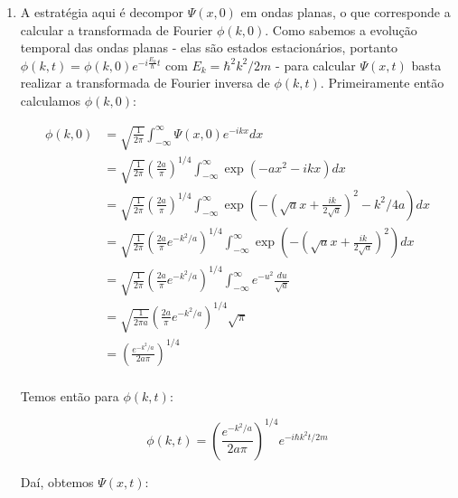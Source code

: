 \documentclass[a4paper, 12pt, notitlepage]{article}
\begin{document}
\begin{enumerate}
\begin{enumerate}
  \item A estratégia aqui é decompor $\Psi(x,0)$ em ondas planas, o que corresponde a calcular a transformada de Fourier $\phi(k, 0)$. Como sabemos a evolução temporal das ondas planas - elas são estados estacionários, portanto $\phi(k, t) = \phi(k, 0) e^{-i\frac{E_k}{\hbar} t}$ com $E_k = \hbar^2 k^2/2m$ - para calcular $\Psi(x, t)$ basta realizar a transformada de Fourier inversa de $\phi(k, t)$.
  Primeiramente então calculamos $\phi(k, 0)$:

  \begin{align*}
  \phi(k, 0) &= \sqrt{\frac{1}{2\pi}} \int_{-\infty}^{\infty} \Psi(x, 0) e^{-ikx} dx \\
  &= \sqrt{\frac{1}{2\pi}} \left(\frac{2a}{\pi}\right)^{1/4} \int_{-\infty}^{\infty} \exp\left(-ax^2 - ikx\right) dx \\
  &= \sqrt{\frac{1}{2\pi}} \left(\frac{2a}{\pi}\right)^{1/4} \int_{-\infty}^{\infty} \exp\left(-\left(\sqrt{a}x + \frac{ik}{2\sqrt{a}}\right)^2 - k^2/4a\right) dx \\
  &= \sqrt{\frac{1}{2\pi}} \left(\frac{2a}{\pi} e^{-k^2/a}\right)^{1/4} \int_{-\infty}^{\infty} \exp\left(-\left(\sqrt{a}x + \frac{ik}{2\sqrt{a}}\right)^2\right) dx \\
  &= \sqrt{\frac{1}{2\pi}} \left(\frac{2a}{\pi} e^{-k^2/a}\right)^{1/4} \int_{-\infty}^{\infty} e^{-u^2} \frac{du}{\sqrt{a}} \\
  &= \sqrt{\frac{1}{2\pi a}} \left(\frac{2a}{\pi} e^{-k^2/a}\right)^{1/4} \sqrt{\pi} \\
  &= \left(\frac{e^{-k^2/a}}{2a\pi}\right)^{1/4} \\
  \end{align*}

  Temos então para $\phi(k, t)$:

  \begin{equation*}
  \phi(k, t) = \left(\frac{e^{-k^2/a}}{2a\pi}\right)^{1/4} e^{-i\hbar k ^2 t/2m} 
  \end{equation*}

  Daí, obtemos $\Psi(x,t)$:


\end{enumerate}
\end{enumerate}
\end{document}
